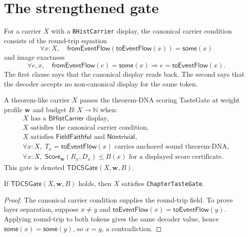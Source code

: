 \section{The strengthened gate}
\label{sec:tdcs-strengthened-gate}

\begin{definition}
\label{def:tdcs-canonical-carrier}
For a carrier $X$ with a \texttt{BHistCarrier} display, the canonical carrier
condition consists of the round-trip equation
$$
\forall x:X,\quad
\mathsf{fromEventFlow}(\mathsf{toEventFlow}(x))=\mathsf{some}(x)
$$
and image exactness
$$
\forall e,x,\quad
\mathsf{fromEventFlow}(e)=\mathsf{some}(x)
\Rightarrow
e=\mathsf{toEventFlow}(x).
$$
The first clause says that the canonical display reads back. The second says
that the decoder accepts no non-canonical display for the same token.
\end{definition}

\begin{definition}
\label{def:tdcs-gate}
A theorem-like carrier $X$ passes the theorem-DNA scoring TasteGate at weight
profile $\mathbf w$ and budget $B:X\to\mathbb N$ when:
$$
\begin{gathered}
X \text{ has a } \mathsf{BHistCarrier}\text{ display},\\
X \text{ satisfies the canonical carrier condition},\\
X \text{ satisfies } \mathsf{FieldFaithful}\text{ and } \mathsf{Nontrivial},\\
\forall x:X,\;T_x=\mathsf{toEventFlow}(x)
\text{ carries anchored sound theorem-DNA},\\
\forall x:X,\;\mathsf{Score}_{\mathbf w}(R_x,D_x)\leq B(x)
\text{ for a displayed score certificate}.
\end{gathered}
$$
This gate is denoted $\mathsf{TDCSGate}(X,\mathbf w,B)$.
\end{definition}

\begin{theorem}
\label{thm:tdcs-implies-chapter-tastegate}
If $\mathsf{TDCSGate}(X,\mathbf w,B)$ holds, then $X$ satisfies
\texttt{ChapterTasteGate}.
\end{theorem}
\begin{proof}
The canonical carrier condition supplies the round-trip field. To prove layer
separation, suppose $x\neq y$ and
$\mathsf{toEventFlow}(x)=\mathsf{toEventFlow}(y)$. Applying round-trip to both
tokens gives the same decoder value, hence $\mathsf{some}(x)=\mathsf{some}(y)$,
so $x=y$, a contradiction.
\end{proof}

